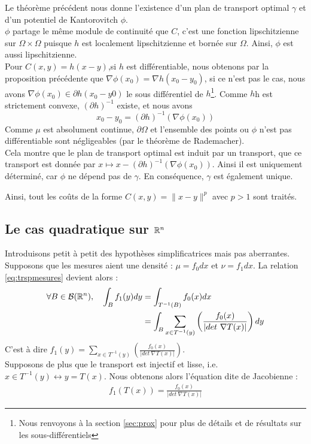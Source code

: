 \documentclass[a4paper,12pt]{article}
\begin{document}
\begin{preuve}
Le théorème précédent nous donne l'existence d'un plan de transport optimal $\gamma$ et d'un potentiel de Kantorovitch $\phi$.\\

$\phi$ partage le même module de continuité que $C$, c'est une fonction lipschitzienne sur $\Omega\times\Omega$ puisque $h$ est localement lipschitzienne et bornée sur $\Omega$. Ainsi, $\phi$ est aussi lipschitzienne.\\

Pour $C(x,y) = h(x-y)$,si $h$ est différentiable, nous obtenons par la proposition précédente que $\nabla\phi (x_0)=\nabla h(x_0-y_0)$, si ce n'est pas le cas, nous avons $\nabla\phi(x_0)\in\partial h(x_0-y0)$ le sous différentiel de $h$\footnote{Nous renvoyons à la section \ref{sec:prox} pour plus de détails et de résultats sur les sous-différentiels}. Comme $h$h est strictement convexe, $(\partial h)^{-1}$ existe, et nous avons 
$$
x_0-y_0=(\partial h)^{-1}(\nabla\phi(x_0))
$$
Comme $\mu$ est absolument continue, $\partial\Omega$ et l'ensemble des points ou $\phi$ n'est pas différentiable sont négligeables (par le théorème de Rademacher). \\

Cela montre que le plan de transport optimal est induit par un transport, que ce transport est donnée par $x\mapsto x -(\partial h)^{-1}(\nabla\phi(x_0))$. Ainsi il est uniquement déterminé, car $\phi$ ne dépend pas de $\gamma$. En conséquence, $\gamma$ est également unique. 
\end{preuve}
Ainsi, tout les coûts de la forme $C(x,y) =\|x-y\|^p$ avec $p>1$ sont traités. 


\subsection{Le cas quadratique sur $\mathbb{R}^n$}










 

\newpage



Introduisons petit à petit des hypothèses simplificatrices mais pas aberrantes. Supposons que les mesures aient une densité : $\mu = f_0 dx$ et $\nu = f_1 dx$. La relation \eqref{eq:trspmesures} devient alors : 
\begin{align*}
\forall B \in\mathcal{B}(\mathbb{R}^n),\quad \int_B f_1(y)dy&=\int_{T^{-1}(B)} f_0(x) dx \\
&= \int_B \sum_{x\in T^{-1}(y)} \left(\frac{f_0(x)}{|det\ \nabla T(x)|}\right)dy\\
\end{align*}
C'est à dire $f_1(y) = \sum_{x\in T^{-1}(y)} \left(\frac{f_0(x)}{|det\ \nabla T(x)|}\right)$.\\
Supposons de plus que le transport est injectif et lisse, i.e. $x\in T^{-1}(y) \leftrightarrow y=T(x)$. Nous obtenons alors l'équation dite de Jacobienne : 
\begin{align}
f_1(T(x)) = \frac{f_0(x)}{|det\ \nabla T(x)|}
\label{eq:jacobienne}
\end{align}
\end{document}
